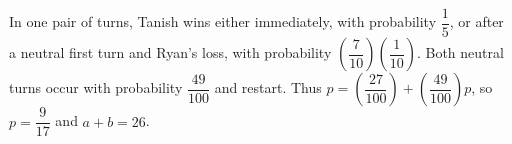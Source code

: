 In one pair of turns, Tanish wins either immediately, with probability $\dfrac{1}{5}$, or after a neutral first turn and Ryan's loss, with probability $(\dfrac{7}{10})(\dfrac{1}{10})$. Both neutral turns occur with probability $\dfrac{49}{100}$ and restart. Thus $p=(\dfrac{27}{100})+(\dfrac{49}{100})p$, so $p=\dfrac{9}{17}$ and $a+b=\boxed{26}$.
